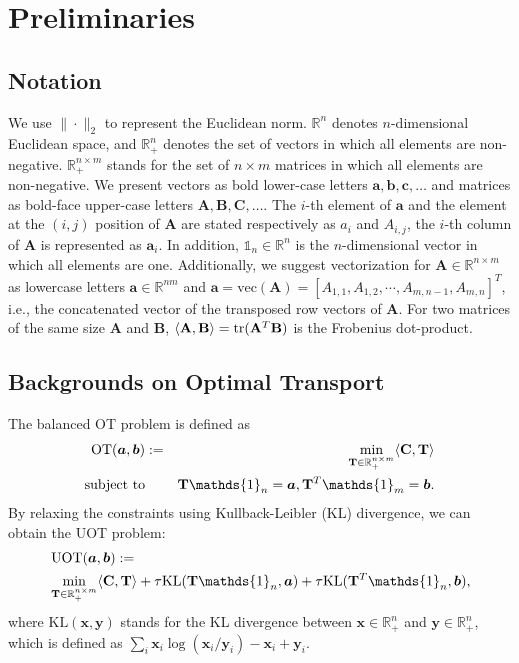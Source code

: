 \documentclass[conference]{IEEEtran}
\newcommand{\R}{\mathbb{R}}
\newcommand{\one}{\mathds{1}}
\newcommand{\mat}[1]{\mathbf{#1}}
\renewcommand{\vec}[1]{\bm{#1}}
\begin{document}
\section{Preliminaries}
\subsection{Notation}
We use $\| \cdot \|_2$ to represent the Euclidean norm. $\mathbb{R}^n$ denotes $n$-dimensional Euclidean space, and $\mathbb{R}^n_+$ denotes the set of vectors in which all elements are non-negative. $\mathbb{R}^{n \times m}_+$ stands for the set of $n \times m$ matrices in which all elements are non-negative. We present vectors as bold lower-case letters $\vec{a},\vec{b},\vec{c},\dots$ and matrices as bold-face upper-case letters $\mat{A},\mat{B},\mat{C},\dots$. The $i$-th element of $\vec{a}$ and the element at the $(i,j)$ position of $\mat{A}$ are stated respectively as $a_i$ and ${A}_{i,j}$, the $i$-th column of $\mat{A}$ is represented as $\vec{a}_i$. In addition, $\one_n \in \mathbb{R}^n$ is the $n$-dimensional vector in which all elements are one. Additionally, we suggest vectorization for $\mat{A} \in \mathbb{R}^{n \times m}$ as lowercase letters $\vec{a} \in \mathbb{R}^{nm}$ and $\vec{a}=\text{vec}(\mat{A})=[{A}_{1,1}, {A}_{1,2}, \cdots, {A}_{m,n-1}, {A}_{m,n}]^T$, i.e., the concatenated vector of the transposed row vectors of $\mat{A}$.
For two matrices of the same size $\mat{A}$ and $\mat{B}$, $\langle \mat{A},\mat{B}\rangle={\rm tr}(\mat{A}^T\mat{B})$ is the Frobenius dot-product.

\subsection{Backgrounds on Optimal Transport}
The balanced OT problem is defined as
\begin{eqnarray}
\label{Eq:Standard_OT}
\operatorname{OT}(\vec{a},\vec{b}) &:=& \min_{ \mat{T} \in \R_{+}^{n \times m}} \langle \mat{C}, \mat{T} \rangle \\
\text{subject\ to}&& \mat{T} \one_n= \vec{a}, \mat{T}^{T}\one_m = \vec{b}. \notag
\end{eqnarray}
By relaxing the constraints using Kullback-Leibler (KL) divergence, we can obtain the UOT problem:
\begin{align}
\label{eq:uot}
&\operatorname{UOT}(\vec{a},\vec{b}) := \notag\\
&\min_{\mat{T} \in \R_{+}^{n \times m}} \langle \mat{C}, \mat{T} \rangle+ \tau \mathrm{KL}(\mat{T} \one_n,\vec{a}) + \tau \mathrm{KL}(\mat{T}^{T} \one_n,\vec{b}),
\end{align}
where $\mathrm{KL}(\vec{x},\vec{y})$ stands for the KL divergence between $\vec{x} \in \mathbb{R}_+^n$ and $\vec{y} \in \mathbb{R}_+^n$, which is defined as $\sum_i \vec{x}_i \log {(\vec{x}_i/\vec{y}_i)} - \vec{x}_i + \vec{y}_i$.
\end{document}
